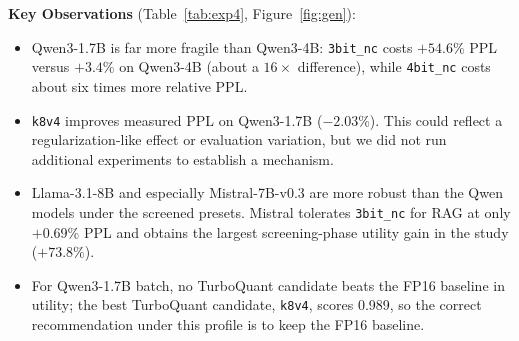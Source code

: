 \documentclass[10pt]{article}
\begin{document}
\textbf{Key Observations} (Table~\ref{tab:exp4}, Figure~\ref{fig:gen}):
\begin{itemize}\itemsep=1pt
\item Qwen3-1.7B is far more fragile than Qwen3-4B: \texttt{3bit\_nc} costs $+54.6\%$ PPL versus $+3.4\%$ on Qwen3-4B (about a $16\times$ difference), while \texttt{4bit\_nc} costs about six times more relative PPL.
\item \texttt{k8v4} improves measured PPL on Qwen3-1.7B ($-2.03\%$). This could reflect a regularization-like effect or evaluation variation, but we did not run additional experiments to establish a mechanism.
\item Llama-3.1-8B and especially Mistral-7B-v0.3 are more robust than the Qwen models under the screened presets. Mistral tolerates \texttt{3bit\_nc} for RAG at only $+0.69\%$ PPL and obtains the largest screening-phase utility gain in the study ($+73.8\%$).
\item For Qwen3-1.7B batch, no TurboQuant candidate beats the FP16 baseline in utility; the best TurboQuant candidate, \texttt{k8v4}, scores 0.989, so the correct recommendation under this profile is to keep the FP16 baseline.
\end{itemize}
\end{document}
